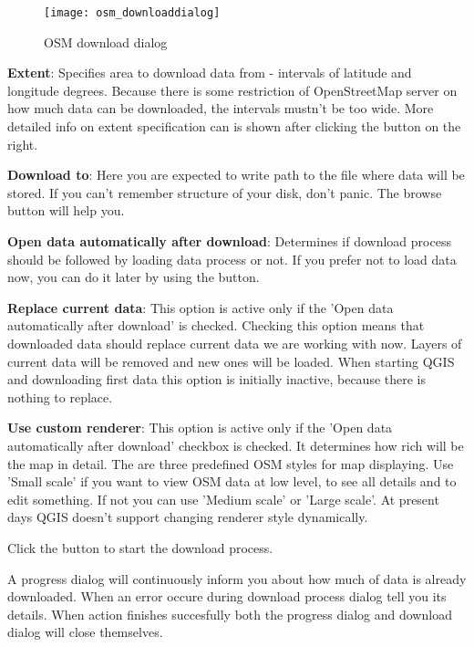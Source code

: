 \begin{figure}[ht]
   \begin{center}
   \caption{OSM download dialog \nixcaption}\label{fig:osmdownload}\smallskip
   \texttt{[image: osm\_downloaddialog]}
\end{center}
\end{figure}

\begin{description}
\item \textbf{Extent}: Specifies area to download data from - intervals 
of latitude and longitude degrees. Because there is some restriction of 
OpenStreetMap server on how much data can be downloaded, the intervals 
mustn't be too wide. More detailed info on extent specification can is 
shown after clicking the  button on 
the right.
\item \textbf{Download to}: Here you are expected to write path to the file 
where data will be stored. If you can't remember structure of your disk, 
don't panic. The browse button will help you.
\item \textbf{Open data automatically after download}: Determines if 
download process should be followed by loading data process or not. If you 
prefer not to load data now, you can do it later by using 
the  button.
\item \textbf{Replace current data}: This option is active only if the 
'Open data automatically after download' is checked. Checking this option 
means that downloaded data should replace
current data we are working with now. Layers of current data will be removed
and new ones will be loaded. When starting QGIS and downloading first data
this option is initially inactive, because there is nothing to replace.
\item \textbf{Use custom renderer}: This option is active only if the 
'Open data automatically after download' checkbox is checked. It determines 
how rich will be the map in detail. The
are three predefined OSM styles for map displaying. Use 'Small scale' if you
want to view OSM data at low level, to see all details and to edit something.
If not you can use 'Medium scale' or 'Large scale'. At present days QGIS
doesn't support changing renderer style dynamically.
\end{description}

Click the  button to start the download process.

A progress dialog will continuously inform you about how much of data is
already downloaded. When an error occure during download process dialog tell
you its details. When action finishes succesfully both the progress dialog
and download dialog will close themselves.

